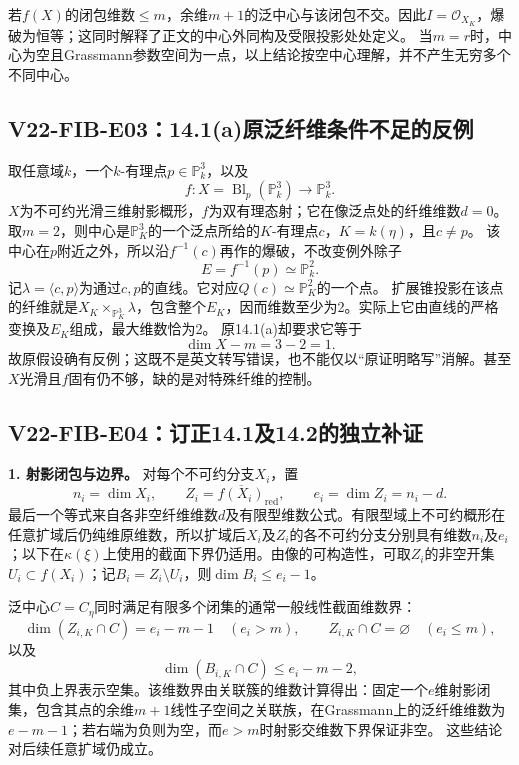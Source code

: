 若$f(X)$的闭包维数$\leq m$，余维$m+1$的泛中心与该闭包不交。因此$I=\mathcal O_{X_K}$，爆破为恒等；这同时解释了正文的中心外同构及受限投影处处定义。
当$m=r$时，中心为空且Grassmann参数空间为一点，以上结论按空中心理解，并不产生无穷多个不同中心。

\subsection*{V22-FIB-E03：14.1(a)原泛纤维条件不足的反例}

取任意域$k$，一个$k$-有理点$p\in\mathbb P^3_k$，以及
\[
f:X=\operatorname{Bl}_p(\mathbb P^3_k)\longrightarrow\mathbb P^3_k.
\]
$X$为不可约光滑三维射影概形，$f$为双有理态射；它在像泛点处的纤维维数$d=0$。取$m=2$，则中心是$\mathbb P^3_K$的一个泛点所给的$K$-有理点$c$，$K=k(\eta)$，且$c\ne p$。
该中心在$p$附近之外，所以沿$f^{-1}(c)$再作的爆破，不改变例外除子
\[
E=f^{-1}(p)\simeq\mathbb P^2_k.
\]
记$\lambda=\langle c,p\rangle$为通过$c,p$的直线。它对应$Q(c)\simeq\mathbb P^2_K$的一个点。
扩展锥投影在该点的纤维就是$X_K\times_{\mathbb P^3_K}\lambda$，包含整个$E_K$，因而维数至少为2。实际上它由直线的严格变换及$E_K$组成，最大维数恰为2。
原14.1(a)却要求它等于
\[
\dim X-m=3-2=1.
\]
故原假设确有反例；这既不是英文转写错误，也不能仅以“原证明略写”消解。甚至$X$光滑且$f$固有仍不够，缺的是对特殊纤维的控制。

\subsection*{V22-FIB-E04：订正14.1及14.2的独立补证}

\noindent\textbf{1. 射影闭包与边界。}
对每个不可约分支$X_i$，置
\[
n_i=\dim X_i,\qquad Z_i=\overline{f(X_i)}_{\mathrm{red}},
\qquad e_i=\dim Z_i=n_i-d.
\]
最后一个等式来自各非空纤维维数$d$及有限型维数公式。有限型域上不可约概形在任意扩域后仍纯维原维数，所以扩域后$X_i$及$Z_i$的各不可约分支分别具有维数$n_i$及$e_i$；以下在$\kappa(\xi)$上使用的截面下界仍适用。由像的可构造性，可取$Z_i$的非空开集$U_i\subset f(X_i)$；记$B_i=Z_i\setminus U_i$，则$\dim B_i\leq e_i-1$。

泛中心$C=C_\eta$同时满足有限多个闭集的通常一般线性截面维数界：
\[
\dim(Z_{i,K}\cap C)=e_i-m-1\quad(e_i>m),\qquad
Z_{i,K}\cap C=\varnothing\quad(e_i\leq m),
\]
以及
\[
\dim(B_{i,K}\cap C)\leq e_i-m-2,
\]
其中负上界表示空集。该维数界由关联簇的维数计算得出：固定一个$e$维射影闭集，包含其点的余维$m+1$线性子空间之关联族，在Grassmann上的泛纤维维数为$e-m-1$；若右端为负则为空，而$e>m$时射影交维数下界保证非空。
这些结论对后续任意扩域仍成立。

